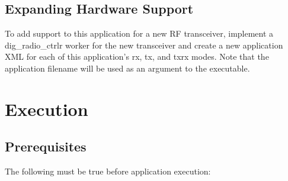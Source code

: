   \subsection{Expanding Hardware Support}
    To add support to this application for a
    new
    RF transceiver, implement a dig\_radio\_ctrlr worker for the new transceiver
    and
    create a new application XML for each of this application's
    rx, tx, and txrx modes. Note that the application filename will be used as
    an argument to the executable.

\section{Execution}

  \begin{center}
  \end{center}

  \subsection{Prerequisites}

    The following must be true before application execution:

